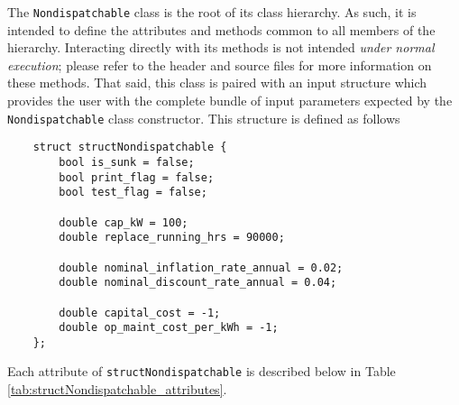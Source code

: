 \documentclass[12pt, letterpaper]{report}
\begin{document}
The \texttt{Nondispatchable} class is the root of its class hierarchy. As such, it is intended to define the attributes and methods common to all members of the hierarchy. Interacting directly with its methods is not intended \textit{under normal execution}; please refer to the header and source files for more information on these methods. That said, this class is paired with an input structure which provides the user with the complete bundle of input parameters expected by the \texttt{Nondispatchable} class constructor. This structure is defined as follows

\begin{verbatim}
    struct structNondispatchable {
        bool is_sunk = false;
        bool print_flag = false;
        bool test_flag = false;
        
        double cap_kW = 100;
        double replace_running_hrs = 90000;
        
        double nominal_inflation_rate_annual = 0.02;
        double nominal_discount_rate_annual = 0.04;
        
        double capital_cost = -1;
        double op_maint_cost_per_kWh = -1;
    };
\end{verbatim}

\noindent Each attribute of \texttt{structNondispatchable} is described below in Table \ref{tab:structNondispatchable_attributes}.
\end{document}
